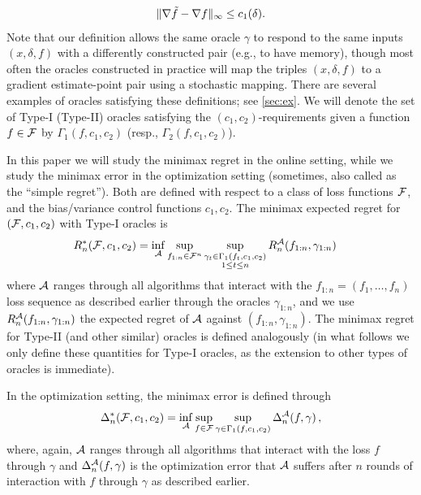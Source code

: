\begin{align}
\|\nabla \tilde{f}- \nabla f\|_\infty \le c_1(\delta).
\end{align}
Note that our definition allows the same oracle $\gamma$ to respond to the same inputs $(x,\delta,f)$ with a differently constructed pair (e.g., to have memory), 
though most often the oracles constructed in practice 
will map the triples $(x,\delta,f)$ to a gradient estimate-point pair using a stochastic mapping.
There are several examples of oracles satisfying these definitions; see \cref{sec:ex}.
We will denote the set of Type-I (Type-II) oracles satisfying the $(c_1,c_2)$-requirements given a function $f\in \mathcal{F}$ by $\Gamma_1(f,c_1,c_2)$ (resp., $\Gamma_2(f,c_1,c_2)$). 

In this paper we will study the minimax regret in the online setting, while we study the minimax error in the optimization setting (sometimes, also called as the ``simple regret'').
Both are defined with respect to a class of loss functions $\mathcal{F}$, and the bias/variance control functions $c_1,c_2$.
The minimax expected regret for $(\mathcal{F},c_1,c_2)$ with Type-I oracles is
\begin{align*}
\MoveEqLeft
R_n^*(\cF,c_1,c_2) 
= \inf_{\cA} \sup_{f_{1:n}\in \cF^n} 
	\sup_{\substack{\gamma_t \in \Gamma_1(f_t,c_1,c_2)\\1\le t \le n}} R_n^{\cA}(f_{1:n},\gamma_{1:n})
\end{align*}
where $\mathcal{A}$ ranges through all algorithms that interact with the $f_{1:n}= (f_1,\dots,f_n)$ loss sequence
as described earlier
through the oracles $\gamma_{1:n}$,
and we use $R_n^{\mathcal{A}}(f_{1:n},\gamma_{1:n})$ the expected regret of $\mathcal{A}$ against $(f_{1:n},\gamma_{1:n})$.
The minimax regret for Type-II (and other similar) oracles is defined analogously (in what follows we only define these quantities for Type-I oracles, as the extension to other types of oracles is immediate).

In the optimization setting, the minimax error is defined through
\begin{align}
\label{eq:minimaxerrdef}
\Delta_n^*(\mathcal{F},c_1,c_2)
= \inf_{\mathcal{A}} \sup_{f \in \mathcal{F}} \sup_{\gamma\in \Gamma_1(f,c_1,c_2)}  \Delta_n^{\mathcal{A}}(f,\gamma)\,,
\end{align}
where, again, $\mathcal{A}$ ranges through all algorithms that interact with the loss $f$ through $\gamma$ and 
$\Delta_n^{\mathcal{A}}(f,\gamma)$ is the optimization error that $\mathcal{A}$ suffers 
after $n$ rounds of interaction with $f$ through $\gamma$ as described earlier.

